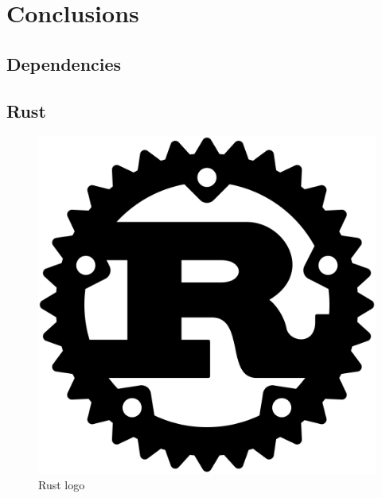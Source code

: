 \chapter{Conclusions}
\label{cha:conclusions}

\section{Dependencies}
\label{sec:conclusions_dependencies}

\section{Rust}
\label{sec:conclusions_rust}

\begin{figure}
  \centering
  \includegraphics[width=.125\textwidth]{images/logos/rust.png}
  \caption{Rust logo}
\end{figure}